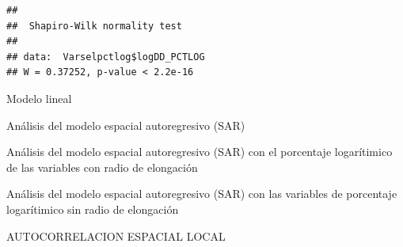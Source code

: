 \documentclass[11pt,]{article}
\newenvironment{Shaded}{\begin{snugshade}}{\end{snugshade}}
\newcommand{\KeywordTok}[1]{\textcolor[rgb]{0.13,0.29,0.53}{\textbf{#1}}}
\newcommand{\DataTypeTok}[1]{\textcolor[rgb]{0.13,0.29,0.53}{#1}}
\newcommand{\StringTok}[1]{\textcolor[rgb]{0.31,0.60,0.02}{#1}}
\newcommand{\OperatorTok}[1]{\textcolor[rgb]{0.81,0.36,0.00}{\textbf{#1}}}
\newcommand{\NormalTok}[1]{#1}
\begin{document}
\begin{Shaded}
\end{Shaded}

\begin{verbatim}
## 
##  Shapiro-Wilk normality test
## 
## data:  Varselpctlog$logDD_PCTLOG
## W = 0.37252, p-value < 2.2e-16
\end{verbatim}

Modelo lineal

\begin{Shaded}
\end{Shaded}

Análisis del modelo espacial autoregresivo (SAR)

Análisis del modelo espacial autoregresivo (SAR) con el porcentaje
logarítimico de las variables con radio de elongación

Análisis del modelo espacial autoregresivo (SAR) con las variables de
porcentaje logarítimico sin radio de elongación

AUTOCORRELACION ESPACIAL LOCAL

\begin{Shaded}
\end{Shaded}
\end{document}
